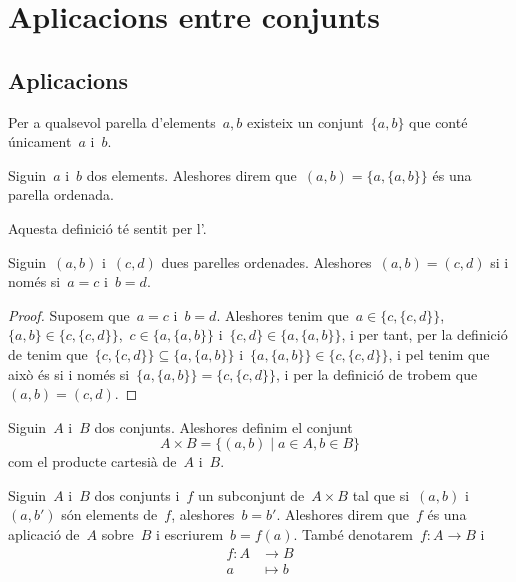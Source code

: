 \documentclass[../fonaments-de-les-matematiques.tex]{subfiles}
\begin{document}
\section{Aplicacions entre conjunts}
    \subsection{Aplicacions}
    \begin{axiom}
        \label{axiom:axioma-del-parell}
        Per a qualsevol parella d'elements~\(a,b\) existeix un conjunt~\(\{a,b\}\) que conté únicament~\(a\) i~\(b\).
    \end{axiom}
    \begin{definition}
        \label{def:parelles-ordenades}
        Siguin~\(a\) i~\(b\) dos elements.
        Aleshores direm que~\((a,b)=\{a,\{a,b\}\}\) és una parella ordenada.

        Aquesta definició té sentit per l'.
    \end{definition}
    \begin{proposition}
        \label{prop:parelles-ordenades}
        Siguin~\((a,b)\) i~\((c,d)\) dues parelles ordenades.
        Aleshores~\((a,b)=(c,d)\) si i només si~\(a=c\) i~\(b=d\).
    \end{proposition}
    \begin{proof}
        Suposem que~\(a=c\) i~\(b=d\).
        Aleshores tenim que~\(a\in\{c,\{c,d\}\}\),~\(\{a,b\}\in\{c,\{c,d\}\}\),~\(c\in\{a,\{a,b\}\}\) i~\(\{c,d\}\in\{a,\{a,b\}\}\), i per tant, per la definició de  tenim que~\(\{c,\{c,d\}\}\subseteq\{a,\{a,b\}\}\) i~\(\{a,\{a,b\}\}\in\{c,\{c,d\}\}\), i pel  tenim que això és si i només si~\(\{a,\{a,b\}\}=\{c,\{c,d\}\}\), i per la definició de  trobem que~\((a,b)=(c,d)\).
    \end{proof}
    \begin{definition}
        \label{def:producte-cartesia-de-conjunts}
        Siguin~\(A\) i~\(B\) dos conjunts.
        Aleshores definim el conjunt
        \[
            A\times B=\{(a,b)\mid a\in A,b\in B\}
        \]
        com el producte cartesià de~\(A\) i~\(B\).
    \end{definition}
    \begin{definition}[Aplicació]
        \label{def:aplicacio}
        Siguin~\(A\) i~\(B\) dos conjunts i~\(f\) un subconjunt de~\(A\times B\) tal que si~\((a,b)\) i~\((a,b')\) són elements de~\(f\), aleshores~\(b=b'\).
        Aleshores direm que~\(f\) és una aplicació de~\(A\) sobre~\(B\) i escriurem~\(b=f(a)\).
        També denotarem~\(f\colon A\longrightarrow B\) i
        \begin{align*}
        f\colon A&\longrightarrow B\\
        a&\longmapsto b
        \end{align*}
    \end{definition}
\end{document}
